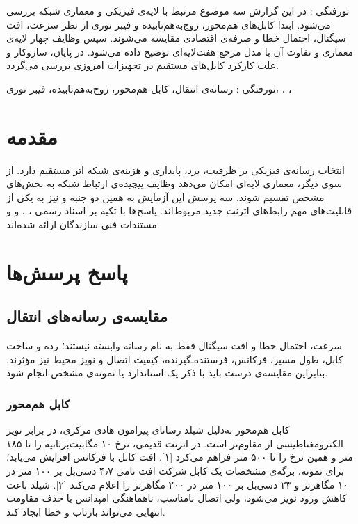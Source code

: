 ‌تورفتگی : در این گزارش سه موضوع مرتبط با لایه‌ی فیزیکی و معماری شبکه بررسی می‌شود.
ابتدا کابل‌های هم‌محور، زوج‌به‌هم‌تابیده و فیبر نوری از نظر سرعت، افت سیگنال، احتمال خطا و صرفه‌ی اقتصادی مقایسه می‌شوند.
سپس وظایف چهار لایه‌ی معماری  و تفاوت آن با مدل مرجع هفت‌لایه‌ای  توضیح داده می‌شود.
در پایان، سازوکار  و علت کارکرد کابل‌های مستقیم در تجهیزات امروزی بررسی می‌گردد.

‌تورفتگی :
رسانه‌ی انتقال، کابل هم‌محور، زوج‌به‌هم‌تابیده، فیبر نوری، ، ، 

\section{مقدمه}

انتخاب رسانه‌ی فیزیکی بر ظرفیت، برد، پایداری و هزینه‌ی شبکه اثر مستقیم دارد.
از سوی دیگر، معماری لایه‌ای امکان می‌دهد وظایف پیچیده‌ی ارتباط شبکه به بخش‌های مشخص تقسیم شوند.
سه پرسش این آزمایش به همین دو جنبه و نیز به یکی از قابلیت‌های مهم رابط‌های اترنت جدید مربوط‌اند.
پاسخ‌ها با تکیه بر اسناد رسمی ، ،  و  و مستندات فنی سازندگان ارائه شده‌اند.

\section{پاسخ پرسش‌ها}

\subsection{مقایسه‌ی رسانه‌های انتقال}

سرعت، احتمال خطا و افت سیگنال فقط به نام رسانه وابسته نیستند؛
رده و ساخت کابل، طول مسیر، فرکانس، فرستنده‌ـ‌گیرنده، کیفیت اتصال و نویز محیط نیز مؤثرند.
بنابراین مقایسه‌ی درست باید با ذکر یک استاندارد یا نمونه‌ی مشخص انجام شود.

\subsubsection{کابل هم‌محور}

کابل هم‌محور به‌دلیل شیلد رسانای پیرامون هادی مرکزی، در برابر نویز الکترومغناطیسی از  مقاوم‌تر است.
در اترنت قدیمی،  نرخ ۱۰ مگابیت‌برثانیه را تا ۱۸۵ متر و  همین نرخ را تا ۵۰۰ متر فراهم می‌کرد [۱].
افت کابل با فرکانس افزایش می‌یابد؛ برای نمونه، برگه‌ی مشخصات یک کابل  شرکت  افت نامی ۴٫۷ دسی‌بل بر ۱۰۰ متر در ۱۰ مگاهرتز و ۲۳ دسی‌بل بر ۱۰۰ متر در ۲۰۰ مگاهرتز را اعلام می‌کند [۲].
شیلد باعث کاهش ورود نویز می‌شود، ولی اتصال نامناسب، ناهماهنگی امپدانس یا حذف مقاومت انتهایی می‌تواند بازتاب و خطا ایجاد کند.

